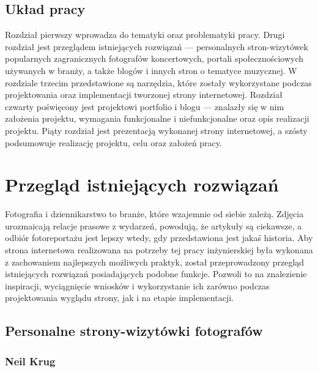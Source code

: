 \documentclass[12pt]{article}
\numberwithin{figure}{section}
\begin{document}
\begin{sloppypar}

\subsection{Układ pracy}

Rozdział pierwszy wprowadza do tematyki oraz problematyki pracy. Drugi rozdział jest przeglądem istniejących rozwiązań --- personalnych stron-wizytówek popularnych zagranicznych fotografów koncertowych, portali społecznościowych używanych w branży, a także blogów i innych stron o tematyce muzycznej. W rozdziale trzecim przedstawione są narzędzia, które zostały wykorzystane podczas projektowania oraz implementacji tworzonej strony internetowej. Rozdział czwarty poświęcony jest projektowi portfolio i blogu --- znalazły się w nim założenia projektu, wymagania funkcjonalne i niefunkcjonalne oraz opis realizacji projektu. Piąty rozdział jest prezentacją wykonanej strony internetowej, a szósty podsumowuje realizację projektu, celu oraz założeń pracy.


\newpage

\section{Przegląd istniejących rozwiązań}

Fotografia i dziennikarstwo to branże, które wzajemnie od siebie zależą. Zdjęcia urozmaicają relacje prasowe z wydarzeń, powodują, że artykuły są ciekawsze, a odbiór fotoreportażu jest lepszy wtedy, gdy przedstawiona jest jakaś historia. Aby strona internetowa realizowana na potrzeby tej pracy inżynierskiej była wykonana z zachowaniem najlepszych możliwych praktyk, został przeprowadzony przegląd istniejących rozwiązań posiadających podobne funkcje. Pozwoli to na znalezienie inspiracji, wyciągnięcie wniosków i wykorzystanie ich zarówno podczas projektowania wyglądu strony, jak i na etapie implementacji.


\subsection{Personalne strony-wizytówki fotografów}




\subsubsection{Neil Krug}


\end{sloppypar}
\end{document}
